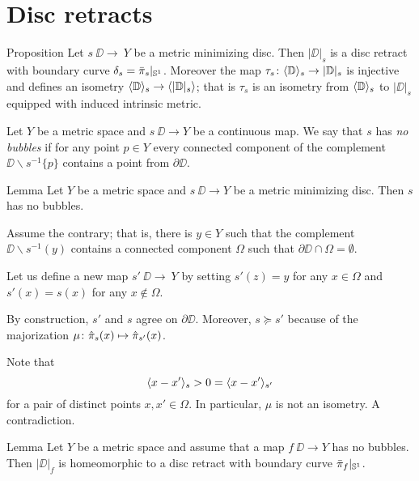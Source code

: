 \section{Disc retracts}\label{Metric minimizing discs}

\begin{thm}{Proposition}\label{prop:|D|}
Let $s\:\DD\to\ Y$ be a metric minimizing disc.
Then $|\DD|_s$ is a disc retract with boundary curve $\delta_s=\bar\pi_s|_{\mathbb{S}^1}$.
Moreover the map $\tau_s\colon\langle\mathbb{D}\rangle_s\to |\mathbb{D}|_s$ is injective and defines an isometry
$\langle\mathbb{D}\rangle_s\to \langle|\mathbb{D}|_s\rangle$;
that is $\tau_s$ is an isometry from $\langle\mathbb{D}\rangle_s$ to $|\DD|_s$ equipped with induced intrinsic metric.
\end{thm}

Let $Y$ be a metric space and
$s\:\DD\to Y$ be a continuous map.
We say that $s$ has \label{page:no-bubble}\emph{no bubbles}
if for any point $p\in Y$ every connected component of the complement $\DD\backslash s^{-1}\{p\}$ contains a point from $\partial \DD$.

\begin{thm}{Lemma}\label{prop:point-complement}
Let $Y$ be a metric space and $s\:\DD\to Y$ be a metric minimizing disc.
Then $s$ has no bubbles.
\end{thm}

Assume the contrary;
that is, there is $y\in Y$ such that the complement $\DD\backslash s^{-1}(y)$ contains a connected component $\Omega$ 
such that $\partial \DD\cap \Omega=\emptyset$.

Let us define a new map $s'\:\DD\to\ Y$ by setting $s'(z)=y$ for any $x\in \Omega$ and $s'(x)=s(x)$ for any $x\notin \Omega$.

By construction, $s'$ and $s$ agree on $\partial\DD$. Moreover, $s\succcurlyeq s'$
because of the majorization $\mu\:\hat\pi_s(x)\zz\mapsto \hat\pi_{s'}(x)$.

Note that
\[\langle x-x'\rangle_{s}>0=\langle x-x'\rangle_{s'}\]
for a pair of distinct points $x,x'\in \Omega$.
In particular, $\mu$ is not an isometry. A contradiction.
\qeds



\begin{thm}{Lemma}\label{prop:disc-moore}
Let $Y$ be a metric space and assume that a map $f\:\DD\to Y$ has no bubbles.
Then $|\DD|_f$ is homeomorphic to a disc retract with boundary curve $\bar\pi_f|_{\mathbb{S}^1}$.
\end{thm}


